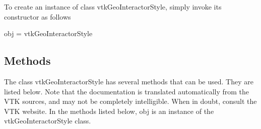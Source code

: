 To create an instance of class vtk\-Geo\-Interactor\-Style, simply invoke its constructor as follows \begin{DoxyVerb}  obj = vtkGeoInteractorStyle
\end{DoxyVerb}
 \hypertarget{vtkwidgets_vtkxyplotwidget_Methods}{}\subsection{Methods}\label{vtkwidgets_vtkxyplotwidget_Methods}
The class vtk\-Geo\-Interactor\-Style has several methods that can be used. They are listed below. Note that the documentation is translated automatically from the V\-T\-K sources, and may not be completely intelligible. When in doubt, consult the V\-T\-K website. In the methods listed below, {\ttfamily obj} is an instance of the vtk\-Geo\-Interactor\-Style class. 
